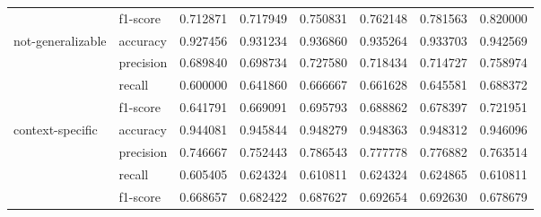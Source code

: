 \begin{tabular}{llrrrrrr}
                 & f1-score &         0.712871 &         0.717949 &         0.750831 &         0.762148 &         0.781563 &          0.820000 \\
not-generalizable & accuracy &         0.927456 &         0.931234 &         0.936860 &         0.935264 &         0.933703 &          0.942569 \\
                 & precision &         0.689840 &         0.698734 &         0.727580 &         0.718434 &         0.714727 &          0.758974 \\
                 & recall &         0.600000 &         0.641860 &         0.666667 &         0.661628 &         0.645581 &          0.688372 \\
                 & f1-score &         0.641791 &         0.669091 &         0.695793 &         0.688862 &         0.678397 &          0.721951 \\
context-specific & accuracy &         0.944081 &         0.945844 &         0.948279 &         0.948363 &         0.948312 &          0.946096 \\
                 & precision &         0.746667 &         0.752443 &         0.786543 &         0.777778 &         0.776882 &          0.763514 \\
                 & recall &         0.605405 &         0.624324 &         0.610811 &         0.624324 &         0.624865 &          0.610811 \\
                 & f1-score &         0.668657 &         0.682422 &         0.687627 &         0.692654 &         0.692630 &          0.678679 \\
\bottomrule
\end{tabular}
